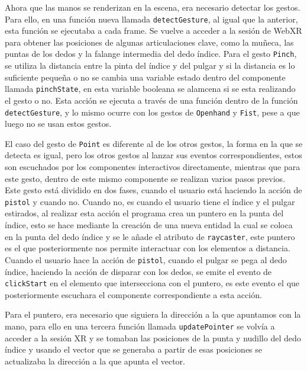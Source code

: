 \documentclass[a4paper, 12pt]{book}
\begin{document}
Ahora que las manos se renderizan en la escena, era necesario detectar los gestos. Para ello, en una función nueva llamada \texttt{detectGesture}, al igual que la anterior, esta función se ejecutaba a cada frame. Se vuelve a acceder a la sesión de WebXR para obtener las posiciones de algunas articulaciones clave, como la muñeca, las puntas de los dedos y la falange intermedia del dedo índice.
Para el gesto \texttt{Pinch}, se utiliza la distancia entre la pinta del índice y del pulgar y si la distancia es lo suficiente pequeña o no se cambia una variable estado dentro del componente llamada \texttt{pinchState}, en esta variable booleana se alamcena si se esta realizando el gesto o no. Esta acción se ejecuta a través de una función dentro de la función \texttt{detectGesture}, y lo mismo ocurre con los gestos de \texttt{Openhand} y \texttt{Fist}, pese a que luego no se usan estos gestos. 

El caso del gesto de \texttt{Point} es diferente al de los otros gestos, la forma en la que se detecta es igual, pero los otros gestos al lanzar sus eventos correspondientes, estos son escuchados por los componentes interactivos directamente, mientras que para este gesto,
dentro de este mismo componente se realizan varios pasos previos. Este gesto está dividido en dos fases, cuando el usuario está haciendo la acción de \texttt{pistol} y cuando no. Cuando no, es cuando el usuario tiene el índice y el pulgar estirados, al realizar esta acción el programa crea un puntero en la punta del índice, esto se hace mediante la creación de una nueva entidad la cual se coloca en la punta del dedo índice y se le añade el atributo de \texttt{raycaster}, este puntero es el que posteriormente nos permite interactuar con los elementos a distancia. Cuando el usuario hace la acción de \texttt{pistol}, cuando el pulgar se pega al dedo índice, haciendo la acción de disparar con los dedos, se emite el evento de \texttt{clickStart} en el elemento que intersecciona con el puntero, es este evento el que posteriormente escuchara el componente correspondiente a esta acción. 

Para el puntero, era necesario que siguiera la dirección a la que apuntamos con la mano, para ello en una tercera función llamada \texttt{updatePointer} se volvía a acceder a la sesión XR y se tomaban las posiciones de la punta y nudillo del dedo índice y usando el vector que se generaba a partir de esas posiciones se actualizaba la dirección a la que apunta el vector.
\end{document}
